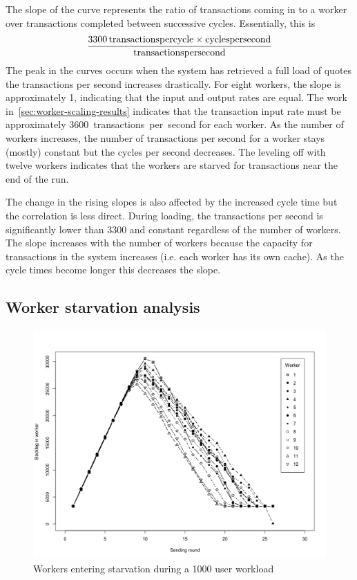 The slope of the curve represents the ratio of transactions coming in to a worker over transactions completed between successive cycles.
Essentially, this is
\begin{equation*}
  {\SI{3300}{transactions per cycle} \times \si{cycles per second} \over \si{transactions per second}}
\end{equation*}
The peak in the curves occurs when the system has retrieved a full load of quotes the transactions per second increases drastically.
For eight workers, the slope is approximately 1, indicating that the input and output rates are equal.
The work in~\ref{sec:worker-scaling-results} indicates that the transaction input rate must be approximately \SI{3600}{transactions per second} for each worker.
As the number of workers increases, the number of transactions per second for a worker stays (mostly) constant but the cycles per second decreases.
The leveling off with twelve workers indicates that the workers are starved for transactions near the end of the run.

The change in the rising slopes is also affected by the increased cycle time but the correlation is less direct.
During loading, the transactions per second is significantly lower than 3300 and constant regardless of the number of workers.
The slope increases with the number of workers because the capacity for transactions in the system increases (i.e. each worker has its own cache).
As the cycle times become longer this decreases the slope.

\subsection{Worker starvation analysis}\label{sec:starvation}

\begin{figure}[tbph]
  \centering
  \includegraphics[width=0.85\linewidth]{../../data/worker-load/backlog_12w}
  \caption{Workers entering starvation during a 1000 user workload}
  \label{fig:backlog12w}
\end{figure}

